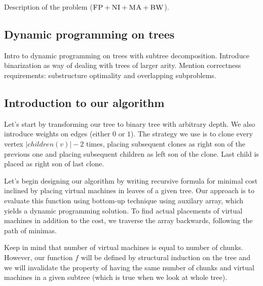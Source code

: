 Description of the problem ($\textsc{FP}+\textsc{NI}+\textsc{MA}+\textsc{BW}$).

\subsection{Dynamic programming on trees}

Intro to dynamic programming on trees with subtree decomposition.
Introduce binarization as way of dealing with trees of larger arity.
Mention correctness requirements: substructure optimality and overlapping subproblems.

\subsection{Introduction to our algorithm}



Let's start by transforming our tree to binary tree with arbitrary
depth. We also introduce weights on edges (either $0$ or $1$). The
strategy we use is to clone every vertex $|children(v)| - 2$ times,
placing subsequent clones as right son of the previous one and placing
subsequent children as left son of the clone. Last child is placed as
right son of last clone.

Let's begin designing our algorithm by writing recursive formula for
minimal cost inclined by placing virtual machines in leaves of a given
tree. Our approach is to evaluate this function using bottom-up
technique using auxilary array, which yields a dynamic programming
solution. To find actual placements of virtual machines in addition to
the cost, we traverse the array backwards, following the path of
minimas.

Keep in mind that number of virtual machines is equal to number of
chunks. However, our function $f$ will be defined by structural
induction on the tree and we will invalidate the property of having
the same number of chunks and virtual machines in a given subtree (which is true when
we look at whole tree).

